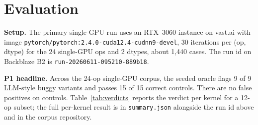 \documentclass[runningheads]{llncs}
\begin{document}
\section{Evaluation}
\label{sec:eval}

\textbf{Setup.} The primary single-GPU run uses an RTX~3060 instance
on vast.ai with image
\texttt{pytorch/pytorch:2.4.0-cuda12.4-cudnn9-devel}, 30 iterations
per (op, dtype) for the 24 single-GPU ops and 2 dtypes, about 1{,}440
cases. The run id on Backblaze B2 is
\texttt{run-20260611-095210-889b18}.

\textbf{P1 headline.} Across the 24-op single-GPU corpus, the seeded
oracle flags 9 of 9 LLM-style buggy variants and passes 15 of 15
correct controls. There are no false positives on controls.
Table~\ref{tab:verdicts} reports the verdict per kernel for a 12-op
subset; the full per-kernel result is in
\texttt{summary.json} alongside the run id above and in the corpus
repository.

\begin{table}[h]
\centering
\caption{P1 verdict per kernel on the 24-op single-GPU corpus, 12-op
subset. \emph{bench} is the fixed-shape allclose-style oracle.
\emph{gpuemu} is the seeded oracle. An \emph{illusion} is a kernel
the bench oracle passes but the seeded oracle fails.}
\label{tab:verdicts}
\end{table}
\end{document}

